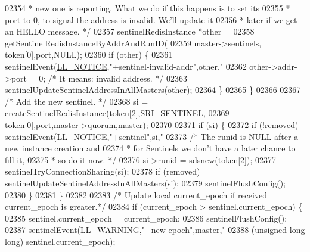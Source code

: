 \begin{DoxyCode}
{{{{{{{{{{{{{{{{{{{{{{{{{{{{{{{{{{{{{{{{{{{{{{{{{02354 \textcolor{comment}{                 * new one is reporting. What we do if this happens is to set its}
02355 \textcolor{comment}{                 * port to 0, to signal the address is invalid. We'll update it}
02356 \textcolor{comment}{                 * later if we get an HELLO message. */}
02357                 sentinelRedisInstance *other =
02358                     getSentinelRedisInstanceByAddrAndRunID(
02359                         master->sentinels, token[0],port,NULL);
02360                 \textcolor{keywordflow}{if} (other) \{
02361                     sentinelEvent(\hyperlink{server_8h_a8c54c191e436c7dd3012167212692401}{LL\_NOTICE},\textcolor{stringliteral}{"+sentinel-invalid-addr"},other,\textcolor{stringliteral}{"%
02362                     other->addr->port = 0; \textcolor{comment}{/* It means: invalid address. */}
02363                     sentinelUpdateSentinelAddressInAllMasters(other);
02364                 \}
02365             \}
02366 
02367             \textcolor{comment}{/* Add the new sentinel. */}
02368             si = createSentinelRedisInstance(token[2],\hyperlink{sentinel_8c_a8ed55207b2af5d2dd314c951ef253f64}{SRI\_SENTINEL},
02369                             token[0],port,master->quorum,master);
02370 
02371             \textcolor{keywordflow}{if} (si) \{
02372                 \textcolor{keywordflow}{if} (!removed) sentinelEvent(\hyperlink{server_8h_a8c54c191e436c7dd3012167212692401}{LL\_NOTICE},\textcolor{stringliteral}{"+sentinel"},si,\textcolor{stringliteral}{"%
02373                 \textcolor{comment}{/* The runid is NULL after a new instance creation and}
02374 \textcolor{comment}{                 * for Sentinels we don't have a later chance to fill it,}
02375 \textcolor{comment}{                 * so do it now. */}
02376                 si->runid = sdsnew(token[2]);
02377                 sentinelTryConnectionSharing(si);
02378                 \textcolor{keywordflow}{if} (removed) sentinelUpdateSentinelAddressInAllMasters(si);
02379                 sentinelFlushConfig();
02380             \}
02381         \}
02382 
02383         \textcolor{comment}{/* Update local current\_epoch if received current\_epoch is greater.*/}
02384         \textcolor{keywordflow}{if} (current\_epoch > sentinel.current\_epoch) \{
02385             sentinel.current\_epoch = current\_epoch;
02386             sentinelFlushConfig();
02387             sentinelEvent(\hyperlink{server_8h_a31229b9334bba7d6be2a72970967a14b}{LL\_WARNING},\textcolor{stringliteral}{"+new-epoch"},master,\textcolor{stringliteral}{"%
02388                 (\textcolor{keywordtype}{unsigned} \textcolor{keywordtype}{long} \textcolor{keywordtype}{long}) sentinel.current\_epoch);
}}}}}}}}}}}}}}}}}}}}}}}}}}}}}}}}}}}}}}}}}}}}}}}}}}}}
\end{DoxyCode}
